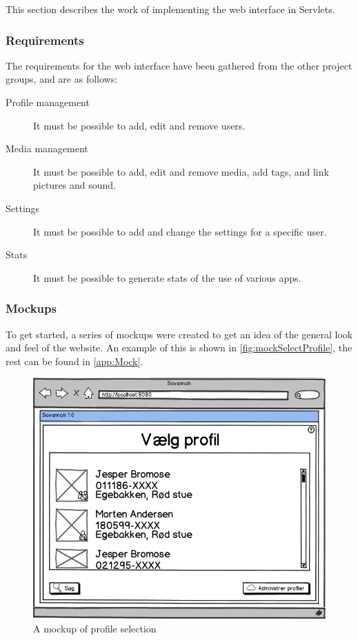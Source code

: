 This section describes the work of implementing the web interface in Servlets.

\subsubsection{Requirements}
\label{subsec:webReq}
The requirements for the web interface have been gathered from the other project groups, and are as follows:
\begin{description}
	\item[Profile management] It must be possible to add, edit and remove users.
	\item[Media management] It must be possible to add, edit and remove media, add tags, and link pictures and sound.
	\item[Settings] It must be possible to add and change the settings for a specific user.
	\item[Stats] It must be possible to generate stats of the use of various apps.
\end{description}

\subsubsection{Mockups}
To get started, a series of mockups were created to get an idea of the general look and feel of the website. An example of this is shown in \autoref{fig:mockSelectProfile}, the rest can be found in \autoref{app:Mock}.

\begin{figure}[htbp]
	\centering
		\includegraphics[width=1.00\textwidth]{images/mockSelectProfile.png}
	\caption{A mockup of profile selection}
	\label{fig:mockSelectProfile}
\end{figure}

